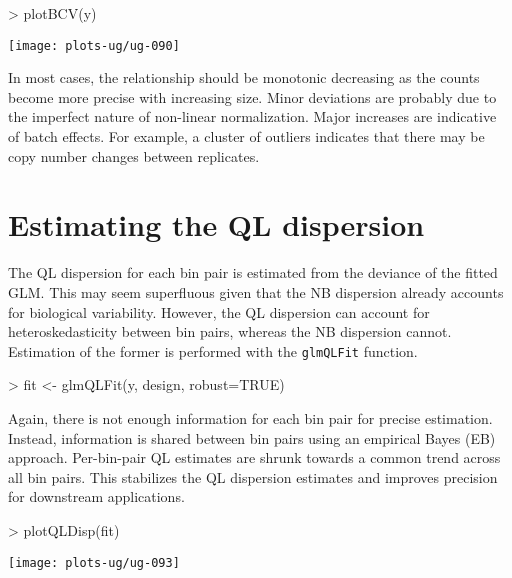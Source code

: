 \documentclass[12pt]{report}
\renewenvironment{Schunk}{\vspace{0pt}}{\vspace{0pt}}
\newcommand{\code}[1]{{\small\texttt{#1}}}
\begin{document}
\begin{Schunk}
\begin{Sinput}
> plotBCV(y)
\end{Sinput}
\end{Schunk}

\begin{center}
\texttt{[image: plots-ug/ug-090]}
\end{center}

In most cases, the relationship should be monotonic decreasing as the counts become more precise with increasing size.
Minor deviations are probably due to the imperfect nature of non-linear normalization.
Major increases are indicative of batch effects.
For example, a cluster of outliers indicates that there may be copy number changes between replicates.

\section{Estimating the QL dispersion}
The QL dispersion for each bin pair is estimated from the deviance of the fitted GLM.
This may seem superfluous given that the NB dispersion already accounts for biological variability.
However, the QL dispersion can account for heteroskedasticity between bin pairs, whereas the NB dispersion cannot.
Estimation of the former is performed with the \code{glmQLFit} function.

\begin{Schunk}
\begin{Sinput}
> fit <- glmQLFit(y, design, robust=TRUE)
\end{Sinput}
\end{Schunk}

Again, there is not enough information for each bin pair for precise estimation.
Instead, information is shared between bin pairs using an empirical Bayes (EB) approach.
Per-bin-pair QL estimates are shrunk towards a common trend across all bin pairs.
This stabilizes the QL dispersion estimates and improves precision for downstream applications.

\begin{Schunk}
\begin{Sinput}
> plotQLDisp(fit)
\end{Sinput}
\end{Schunk}

\begin{center}
\texttt{[image: plots-ug/ug-093]}
\end{center}
\end{document}
